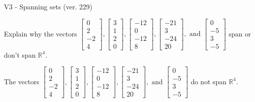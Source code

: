 \begin{exercise}
  \begin{exerciseTitle}V3 - Spanning sets (ver. 229)\end{exerciseTitle}
  \begin{exerciseStatement}
    Explain why the vectors \(\left[\begin{array}{r}
0 \\
2 \\
-2 \\
4
\end{array}\right] , \left[\begin{array}{r}
3 \\
1 \\
2 \\
0
\end{array}\right] , \left[\begin{array}{r}
-12 \\
0 \\
-12 \\
8
\end{array}\right] , \left[\begin{array}{r}
-21 \\
3 \\
-24 \\
20
\end{array}\right] , \text{ and } \left[\begin{array}{r}
0 \\
-5 \\
3 \\
-5
\end{array}\right]\) span or don't span \(\mathbb{R}^4\). 
	


  \end{exerciseStatement}
  \begin{exerciseAnswer}
   The vectors \(\left[\begin{array}{r}
0 \\
2 \\
-2 \\
4
\end{array}\right] , \left[\begin{array}{r}
3 \\
1 \\
2 \\
0
\end{array}\right] , \left[\begin{array}{r}
-12 \\
0 \\
-12 \\
8
\end{array}\right] , \left[\begin{array}{r}
-21 \\
3 \\
-24 \\
20
\end{array}\right] , \text{ and } \left[\begin{array}{r}
0 \\
-5 \\
3 \\
-5
\end{array}\right]\) 
  	 do not  
	span \(\mathbb{R}^4\).
  



\end{exerciseAnswer}
\end{exercise}
